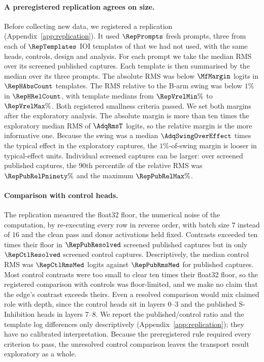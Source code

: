 \documentclass{article}
\theoremstyle{plain}
\theoremstyle{definition}
\begin{document}
\paragraph{A preregistered replication agrees on size.} Before collecting new data, we registered a replication
(Appendix~\ref{app:replication}). It used $\RepPrompts$ fresh prompts, three from each of $\RepTemplates$ IOI templates
of \citet{wang2022ioi} that we had not used, with the same heads, controls, design and analysis. For each prompt we
take the median RMS over its screened published captures. Each template is then summarised by the median over its
three prompts. The absolute RMS was below $\MfMargin$ logits in $\RepHAbsCount$ templates. The RMS relative to the
B-arm swing was below $1\%$ in $\RepHRelCount$, with template medians from $\RepVrelMin\%$ to $\RepVrelMax\%$. Both
registered smallness criteria passed. We set both margins after the exploratory analysis. The absolute margin is more than ten times
the exploratory median RMS of $\AdqRmsT$ logits, so the relative margin is the more informative one. Because the swing was a median $\AdqSwingOverEffect$ times the
typical effect in the exploratory captures, the $1\%$-of-swing margin is looser in typical-effect units.
Individual screened captures can be larger: over screened published captures, the 90th percentile of the relative RMS
was $\RepPubRelPninety\%$ and the maximum $\RepPubRelMax\%$.

\paragraph{Comparison with control heads.} The replication measured the
float32 floor, the numerical noise of the computation, by re-executing every row in reverse order, with batch size $7$ instead of $16$ and the clean pass and
donor activations held fixed. Contrasts exceeded ten times their floor in $\RepPubResolved$ screened published captures
but in only $\RepCtlResolved$ screened control captures. Descriptively, the median control RMS was $\RepCtlRmsMed$ logits against $\RepPubRmsMed$ for published captures.
Most control contrasts were too small to clear ten times their float32 floor, so the registered comparison with
controls was floor-limited,
and we make no claim that the edge's contrast exceeds theirs. Even a resolved comparison would mix claimed role with
depth, since the control heads sit in layers 0--3 and the published S-Inhibition heads in layers 7--8. We report the published/control ratio
and the template log differences only descriptively (Appendix~\ref{app:replication}); they have no calibrated
interpretation. Because the preregistered rule required every
criterion to pass, the unresolved control comparison leaves the transport result exploratory as a whole.
\end{document}
